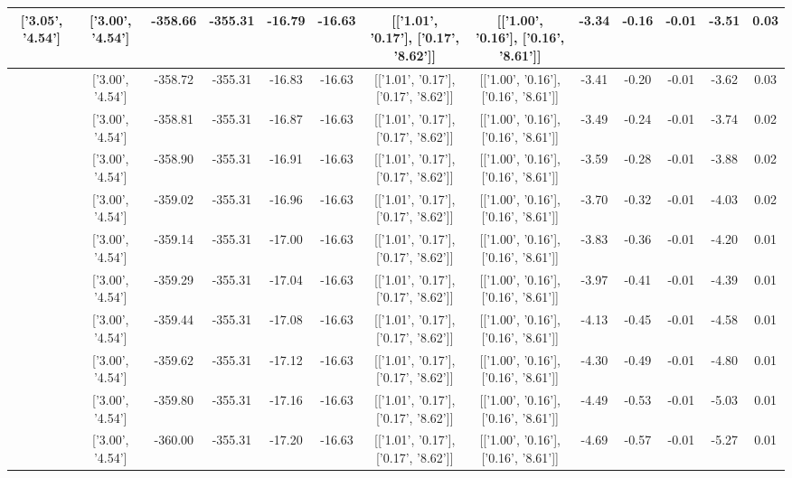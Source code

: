 \begin{table}[htbp]
\begin{adjustbox}{angle=90}
\begin{tabular}{|c|c|c|c|c|c|c|c|c|c|c|c|c|}
 ['3.05', '4.54'] & ['3.00', '4.54'] & -358.66 & -355.31 & -16.79 & -16.63 & [['1.01', '0.17'], ['0.17', '8.62']] & [['1.00', '0.16'], ['0.16', '8.61']] & -3.34 & -0.16 & -0.01 & -3.51 & 0.03\\ \hline
 ['3.06', '4.54'] & ['3.00', '4.54'] & -358.72 & -355.31 & -16.83 & -16.63 & [['1.01', '0.17'], ['0.17', '8.62']] & [['1.00', '0.16'], ['0.16', '8.61']] & -3.41 & -0.20 & -0.01 & -3.62 & 0.03\\ \hline
 ['3.07', '4.54'] & ['3.00', '4.54'] & -358.81 & -355.31 & -16.87 & -16.63 & [['1.01', '0.17'], ['0.17', '8.62']] & [['1.00', '0.16'], ['0.16', '8.61']] & -3.49 & -0.24 & -0.01 & -3.74 & 0.02\\ \hline
 ['3.08', '4.54'] & ['3.00', '4.54'] & -358.90 & -355.31 & -16.91 & -16.63 & [['1.01', '0.17'], ['0.17', '8.62']] & [['1.00', '0.16'], ['0.16', '8.61']] & -3.59 & -0.28 & -0.01 & -3.88 & 0.02\\ \hline
 ['3.10', '4.54'] & ['3.00', '4.54'] & -359.02 & -355.31 & -16.96 & -16.63 & [['1.01', '0.17'], ['0.17', '8.62']] & [['1.00', '0.16'], ['0.16', '8.61']] & -3.70 & -0.32 & -0.01 & -4.03 & 0.02\\ \hline
 ['3.11', '4.55'] & ['3.00', '4.54'] & -359.14 & -355.31 & -17.00 & -16.63 & [['1.01', '0.17'], ['0.17', '8.62']] & [['1.00', '0.16'], ['0.16', '8.61']] & -3.83 & -0.36 & -0.01 & -4.20 & 0.01\\ \hline
 ['3.12', '4.55'] & ['3.00', '4.54'] & -359.29 & -355.31 & -17.04 & -16.63 & [['1.01', '0.17'], ['0.17', '8.62']] & [['1.00', '0.16'], ['0.16', '8.61']] & -3.97 & -0.41 & -0.01 & -4.39 & 0.01\\ \hline
 ['3.13', '4.55'] & ['3.00', '4.54'] & -359.44 & -355.31 & -17.08 & -16.63 & [['1.01', '0.17'], ['0.17', '8.62']] & [['1.00', '0.16'], ['0.16', '8.61']] & -4.13 & -0.45 & -0.01 & -4.58 & 0.01\\ \hline
 ['3.14', '4.55'] & ['3.00', '4.54'] & -359.62 & -355.31 & -17.12 & -16.63 & [['1.01', '0.17'], ['0.17', '8.62']] & [['1.00', '0.16'], ['0.16', '8.61']] & -4.30 & -0.49 & -0.01 & -4.80 & 0.01\\ \hline
 ['3.16', '4.55'] & ['3.00', '4.54'] & -359.80 & -355.31 & -17.16 & -16.63 & [['1.01', '0.17'], ['0.17', '8.62']] & [['1.00', '0.16'], ['0.16', '8.61']] & -4.49 & -0.53 & -0.01 & -5.03 & 0.01\\ \hline
 ['3.17', '4.55'] & ['3.00', '4.54'] & -360.00 & -355.31 & -17.20 & -16.63 & [['1.01', '0.17'], ['0.17', '8.62']] & [['1.00', '0.16'], ['0.16', '8.61']] & -4.69 & -0.57 & -0.01 & -5.27 & 0.01\\ \hline

\end{tabular}
\end{adjustbox}
\end{table}

